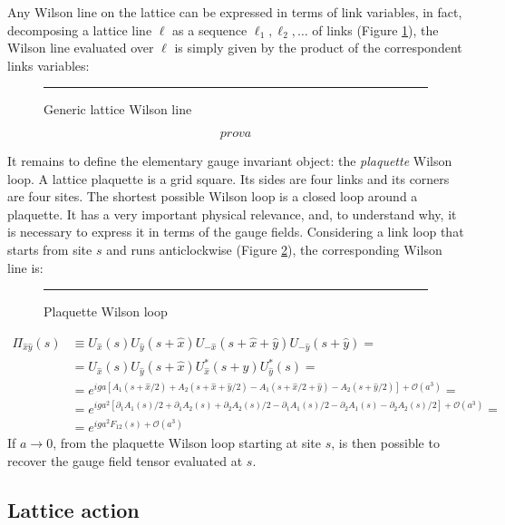 Any Wilson line on the lattice can be expressed in terms of link variables,
in fact, decomposing a lattice line $\ell$ as a sequence $\ell_1, \ell_2, \ldots$ of links (Figure \ref{fig:line}),
the Wilson line evaluated over $\ell$ is simply given by the product of the correspondent links variables:
\begin{figure}[!htb]
    \centering
    \rule{3in}{1.5in}
    \caption{Generic lattice Wilson line}
    \label{fig:line}
\end{figure}
\[
    prova
\]

It remains to define the elementary gauge invariant object: the \emph{plaquette} Wilson loop.
A lattice plaquette is a grid square. Its sides are four links and its corners are four sites.
The shortest possible Wilson loop is a closed loop around a plaquette.
It has a very important physical relevance, and, to understand why,
it is necessary to express it in terms of the gauge fields.
Considering a link loop that starts from site $s$ and runs anticlockwise (Figure \ref{fig:plaq}),
the corresponding Wilson line is:
\begin{figure}[!htb]
    \centering
    \rule{3in}{1.5in}
    \caption{Plaquette Wilson loop}
    \label{fig:plaq}
\end{figure}
\begin{equation}\label{eq:plaq}
    \begin{aligned}
        \Pi_{\hat x\hat y}(s) &\equiv U_{\hat x}(s) U_{\hat y}(s+\hat x) U_{-\hat x}(s+\hat x+\hat y) U_{-\hat y}(s+\hat y) = \\
                              &= U_{\hat x}(s) U_{\hat y}(s+\hat x) U^*_{\hat x}(s+\hat y) U^*_{\hat y}(s) = \\
                              &= e^{iga[A_1(s+\hat x/2) + A_2(s+\hat x+\hat y/2) - A_1(s+\hat x/2+\hat y) - A_2(s+\hat y/2)]+ \mathcal O\left(a^3\right)} = \\
                              &= e^{iga^2[\partial_1A_1(s)/2 + \partial_1A_2(s) + \partial_2A_2(s)/2 - \partial_1A_1(s)/2 - \partial_2A_1(s) - \partial_2A_2(s)/2] %
                                    + \mathcal O\left(a^3\right)} = \\
                              &= e^{iga^2F_{12}(s) + \mathcal O\left(a^3\right)}
    \end{aligned}
\end{equation}
If $a \to 0$, from the plaquette Wilson loop starting at site $s$, is then possible to recover the gauge field tensor evaluated at $s$.

\subsection*{Lattice action}

